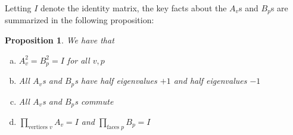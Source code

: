 \documentclass{article}
\newtheorem{proposition}{Proposition}[section]
\theoremstyle{definition}
\numberwithin{figure}{section}
\begin{document}
Letting $I$ denote the identity matrix, the key facts about the $A_v$s and $B_p$s are summarized in the following proposition:

\begin{proposition}\label{AvBp}We have that

\begin{enumerate}[(a)]
\item $A_v^2=B_p^2=I$ for all $v,p$
\item All $A_v$s and $B_p$s have half eigenvalues $+1$ and half eigenvalues $-1$
\item All $A_v$s and $B_p$s commute
\item $\prod_{\text{vertices }v}A_v=I$ and $\prod_{\text{faces }p}B_p=I$
\end{enumerate}

\end{proposition}
\end{document}
